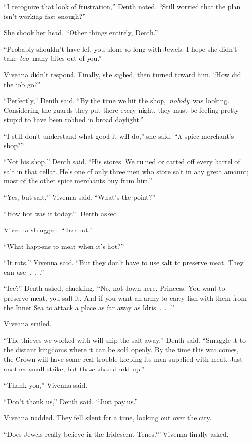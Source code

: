 “I recognize that look of frustration,” Denth noted. “Still worried that the plan isn’t working fast enough?”

She shook her head. “Other things entirely, Denth.”

“Probably shouldn’t have left you alone so long with Jewels. I hope she didn’t take~\textit{too}~many bites out of you.”

Vivenna didn’t respond. Finally, she sighed, then turned toward him. “How did the job go?”

“Perfectly,” Denth said. “By the time we hit the shop,~\textit{nobody}~was looking. Considering the guards they put there every night, they must be feeling pretty stupid to have been robbed in broad daylight.”

“I still don’t understand what good it will do,” she said. “A spice merchant’s shop?”

“Not his shop,” Denth said. “His stores. We ruined or carted off every barrel of salt in that cellar. He’s one of only three men who store salt in any great amount; most of the other spice merchants buy from him.”

“Yes, but salt,” Vivenna said. “What’s the point?”

“How hot was it today?” Denth asked.

Vivenna shrugged. “Too hot.”

“What happens to meat when it’s hot?”

“It rots,” Vivenna said. “But they don’t have to use salt to preserve meat. They can use~.~.~.”

“Ice?” Denth asked, chuckling. “No, not down here, Princess. You want to preserve meat, you salt it. And if you want an army to carry fish with them from the Inner Sea to attack a place as far away as Idris~.~.~.”

Vivenna smiled.

“The thieves we worked with will ship the salt away,” Denth said. “Smuggle it to the distant kingdoms where it can be sold openly. By the time this war comes, the Crown will have some real trouble keeping its men supplied with meat. Just another small strike, but those should add up.”

“Thank you,” Vivenna said.

“Don’t thank us,” Denth said. “Just pay us.”

Vivenna nodded. They fell silent for a time, looking out over the city.

“Does Jewels really believe in the Iridescent Tones?” Vivenna finally asked.


